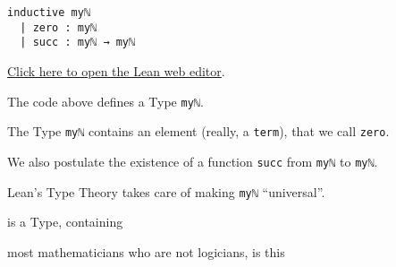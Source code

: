 \documentclass{beamer}
\begin{document}
\begin{frame}[fragile]

\begin{verbatim}
inductive myℕ
  | zero : myℕ
  | succ : myℕ → myℕ
\end{verbatim}
{\small{\href{https://leanprover-community.github.io/lean-web-editor/#code=inductive%20my%E2%84%95%0A%20%20%7C%20zero%20%3A%20my%E2%84%95%0A%20%20%7C%20succ%20%3A%20my%E2%84%95%20%E2%86%92%20my%E2%84%95%0A%0A%23print%20prefix%20my%E2%84%95%0A}{Click here to open the Lean web editor}.}}
\bigskip

The code above defines a Type {\color{violet}\verb`myℕ`}.
\bigskip

The Type {\color{violet}\verb`myℕ`} contains an element (really, a {\color{violet}\verb`term`}), that we call {\color{violet}\verb`zero`}.
\bigskip

We also postulate the existence of a function {\color{violet}\verb`succ`} from {\color{violet}\verb`myℕ`} to {\color{violet}\verb`myℕ`}.
\bigskip

Lean's Type Theory takes care of making {\color{violet}\verb`myℕ`} ``universal''.
\end{frame}

\begin{frame}[fragile]

 is a Type, containing

 most mathematicians who are not logicians, is this
\end{frame}
\end{document}
